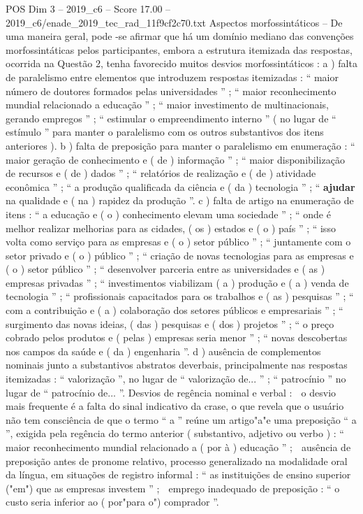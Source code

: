 \begin{textsample}{POS Dim 3 – 2019\_c6 – Score 17.00 – 2019\_c6/enade\_2019\_tec\_rad\_11f9cf2c70.txt}
Aspectos morfossintáticos – De uma maneira geral, pode -se afirmar que há um domínio mediano das convenções morfossintáticas pelos participantes, embora a estrutura itemizada das respostas, ocorrida na Questão 2, tenha favorecido muitos desvios morfossintáticos : a ) falta de paralelismo entre elementos que introduzem respostas itemizadas : “ maior número de doutores formados pelas universidades ” ; “ maior reconhecimento mundial relacionado a educação ” ; “ maior investimento de multinacionais, gerando empregos ” ; “ estimular o empreendimento interno ” ( no lugar de “ estímulo ” para manter o paralelismo com os outros substantivos dos itens anteriores ). b ) falta de preposição para manter o paralelismo em enumeração : “ maior geração de conhecimento e ( de ) informação ” ; “ maior disponibilização de recursos e ( de ) dados ” ; “ relatórios de realização e ( de ) atividade econômica ” ; “ a produção qualificada da ciência e ( da ) tecnologia ” ; “ \textbf{ajudar} na qualidade e ( na ) rapidez da produção ”. c ) falta de artigo na enumeração de itens : “ a educação e ( o ) conhecimento elevam uma sociedade ” ; “ onde é melhor realizar melhorias para as cidades, ( os ) estados e ( o ) país ” ; “ isso volta como serviço para as empresas e ( o ) setor público ” ; “ juntamente com o setor privado e ( o ) público ” ; “ criação de novas tecnologias para as empresas e ( o ) setor público ” ; “ desenvolver parceria entre as universidades e ( as ) empresas privadas ” ; “ investimentos viabilizam ( a ) produção e ( a ) venda de tecnologia ” ; “ profissionais capacitados para os trabalhos e ( as ) pesquisas ” ; “ com a contribuição e ( a ) colaboração dos setores públicos e empresariais ” ; “ surgimento das novas ideias, ( das ) pesquisas e ( dos ) projetos ” ; “ o preço cobrado pelos produtos e ( pelas ) empresas seria menor ” ; “ novas descobertas nos campos da saúde e ( da ) engenharia ”. d ) ausência de complementos nominais junto a substantivos abstratos deverbais, principalmente nas respostas itemizadas : “ valorização ”, no lugar de “ valorização de... ” ; “ patrocínio ” no lugar de “ patrocínio de... ”.
Desvios de regência nominal e verbal :  o desvio mais frequente é a falta do sinal indicativo da crase, o que revela que o usuário não tem consciência de que o termo “ a ” reúne um artigo"a"e uma preposição “ a ”, exigida pela regência do termo anterior ( substantivo, adjetivo ou verbo ) : “ maior reconhecimento mundial relacionado a ( por à ) educação ” ;  ausência de preposição antes de pronome relativo, processo generalizado na modalidade oral da língua, em situações de registro informal : “ as instituições de ensino superior ("em") que as empresas investem ” ;  emprego inadequado de preposição : “ o custo seria inferior ao ( por"para o") comprador ”.

\end{textsample}
